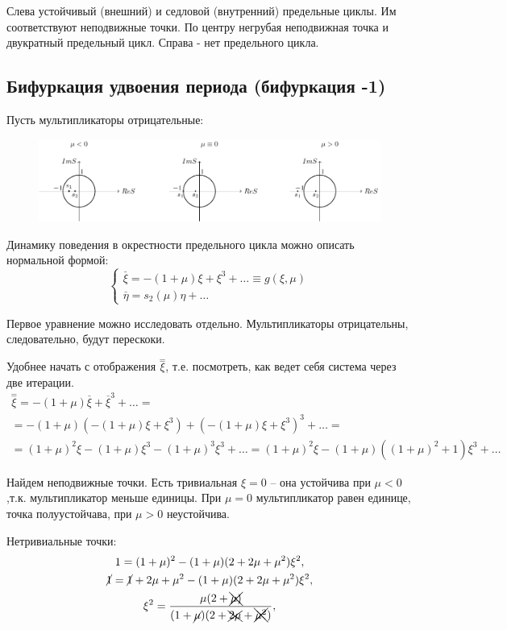 Слева устойчивый (внешний) и седловой (внутренний) предельные циклы. Им соответствуют неподвижные точки. По центру негрубая неподвижная точка и двукратный предельный цикл. Справа - нет предельного цикла.

\subsection{Бифуркация удвоения периода (бифуркация -1)}
Пусть мультипликаторы отрицательные:
\begin{figure}[H]
	\centering
	\includegraphics[width=1\linewidth]{fig/fig67.pdf}   
\end{figure}

Динамику поведения в окрестности предельного цикла можно описать нормальной формой:
\begin{equation}
	\begin{cases}
		\stackrel{\_}{\xi}= -(1+\mu)\xi+\xi^3+\dots \equiv g(\xi,\mu)\\
		\stackrel{\_}{\eta}= s_2(\mu)\eta+\dots
	\end{cases}
	\label{eq:110}	
\end{equation}

Первое уравнение можно исследовать отдельно. Мультипликаторы отрицательны, следовательно, будут перескоки. 

Удобнее начать с отображения $\stackrel{=}{\xi}$, т.е. посмотреть, как ведет себя система через две итерации.
\begin{gather*}
	\stackrel{=}{\xi}=-(1+\mu)\stackrel{\_}{\xi}+\stackrel{\_}{\xi}^3+\dots= \\
	=-(1+\mu)(-(1+\mu)\xi+\xi^3)+(-(1+\mu)\xi+\xi^3)^3+\dots= \\
	=(1+\mu)^2\xi-(1+\mu)\xi^3-(1+\mu)^3\xi^3+\dots=(1+\mu)^2\xi-(1+\mu)((1+\mu)^2+1)\xi^3+\dots
\end{gather*}


Найдем неподвижные точки. Есть тривиальная $\xi=0$ -- она устойчива при $\mu<0$,т.к. мультипликатор меньше единицы. При $\mu=0$ мультипликатор равен единице, точка полуустойчава, при $\mu>0$ неустойчива.

Нетривиальные точки:
\begin{gather*}
	1=(1+\mu)^2-(1+\mu)(2+2\mu+\mu^2)\xi^2, \\
	\cancel{1}=\cancel{1} +2\mu+\mu^2-(1+\mu)(2+2\mu+\mu^2)\xi^2, \\
	\xi^2=\frac{\mu(2+\xcancel{\mu)}}{(1+\cancel{\mu})(2+\xcancel{2\mu}+\xcancel{\mu^2})},
\end{gather*}

